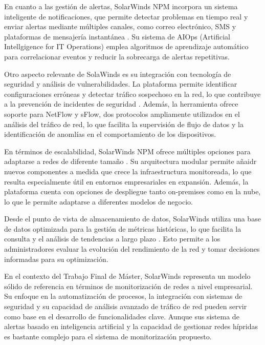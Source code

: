 En cuanto a las gestión de alertas, SolarWinds NPM incorpora un sistema inteligente de notificaciones, que permite detectar problemas en tiempo real y enviar alertas mediante múltiples canales, como correo electrónico, SMS y plataformas de mensajería instantánea \citep{solarwinds2025}. Su sistema de AIOps (Artificial Intellgigence for IT Operations) emplea algoritmos de aprendizaje automático para correlacionar eventos y reducir la sobrecarga de alertas repetitivas.

Otro aspecto relevante de SolaWinds es su integración con tecnología de seguridad y análisis de vulnerabilidades. La plataforma permite identificar configuraciones erróneas y detectar tráfico sospechoso en la red, lo que contribuye a la prevención de incidentes de seguridad \citep{solarwinds2025}. Además, la herramienta ofrece soporte para NetFlow y sFlow, dos protocolos ampliamente utilizados en el análisis del tráfico de red, lo que facilita la supervisión de flujo de datos y la identificación de anomlías en el comportamiento de los dispositivos.

En términos de escalabilidad, SolarWinds NPM ofrece múltiples opciones para adaptarse a redes de diferente tamaño \citep{solarwindsdatasheet2025}. Su arquitectura modular permite añaidr nuevos componentes a medida que crece la infraestructura monitoreada, lo que resulta especialmente útil en entornos empresariales en expansión. Además, la plataforma cuenta con opciones de despliegue tanto on-premises como en la nube, lo que le permite adaptarse a diferentes modelos de negocio.

Desde el punto de vista de almacenamiento de datos, SolarWinds utiliza una base de datos optimizada para la gestión de métricas históricas, lo que facilita la consulta y el análisis de tendencias a largo plazo \citep{solarwindsdatasheet2025}. Esto permite a los administradores evaluar la evolución del rendimiento de la red y tomar decisiones informadas para su optimización.

En el contexto del Trabajo Final de Máster, SolarWinds representa un modelo sólido de referencia en términos de monitorización de redes a nivel empresarial. Su enfoque en la automatización de procesos, la integración con sistemas de seguridad y su capacidad de análisis avanzado de tráfico de red pueden servir como base en el desarrollo de funcionalidades clave. Aunque sus sistema de alertas basado en inteligencia artificial y la capacidad de gestionar redes hípridas es bastante complejo para el sistema de monitorización propuesto.


